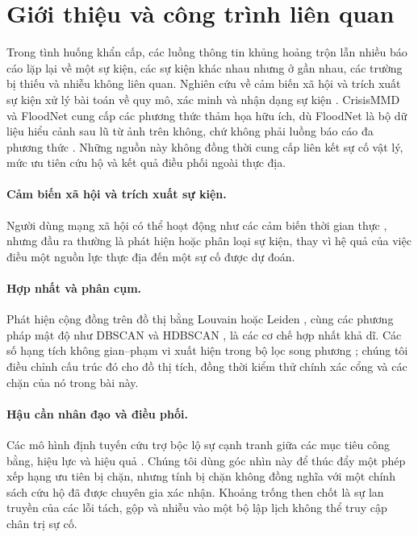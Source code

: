 \documentclass[runningheads]{llncs}
\begin{document}
\section{Giới thiệu và công trình liên quan}

Trong tình huống khẩn cấp, các luồng thông tin khủng hoảng trộn lẫn nhiều
báo cáo lặp lại về một sự kiện, các sự kiện khác nhau nhưng ở gần nhau, các
trường bị thiếu và nhiễu không liên quan. Nghiên cứu về cảm biến xã hội và
trích xuất sự kiện xử lý bài toán về quy mô, xác minh và nhận dạng sự kiện
\cite{sakaki2010earthquake}. CrisisMMD và FloodNet cung cấp các phương thức
thảm họa hữu ích, dù FloodNet là bộ dữ liệu hiểu cảnh sau lũ từ ảnh trên
không, chứ không phải luồng báo cáo đa phương thức
\cite{alam2018crisismmd,rahnemoonfar2021floodnet}. Những nguồn này không
đồng thời cung cấp liên kết sự cố vật lý, mức ưu tiên cứu hộ và kết quả điều
phối ngoài thực địa.

\paragraph{Cảm biến xã hội và trích xuất sự kiện.}
Người dùng mạng xã hội có thể hoạt động như các cảm biến thời gian thực
\cite{sakaki2010earthquake}, nhưng đầu ra thường là phát hiện hoặc phân
loại sự kiện, thay vì hệ quả của việc điều một nguồn lực thực địa đến một sự
cố được dự đoán.

\paragraph{Hợp nhất và phân cụm.}
Phát hiện cộng đồng trên đồ thị bằng Louvain hoặc Leiden
\cite{blondel2008louvain,traag2019leiden}, cùng các phương pháp mật độ như
DBSCAN và HDBSCAN \cite{ester1996dbscan}, là các cơ chế hợp nhất khả dĩ.
Các số hạng tích không gian--phạm vi xuất hiện trong bộ lọc song phương
\cite{tomasi1998bilateral}; chúng tôi điều chỉnh cấu trúc đó cho đồ thị tích,
đồng thời kiểm thử chính xác cổng và các chặn của nó trong bài này.

\paragraph{Hậu cần nhân đạo và điều phối.}
Các mô hình định tuyến cứu trợ bộc lộ sự cạnh tranh giữa các mục tiêu công
bằng, hiệu lực và hiệu quả \cite{gralla2014review}. Chúng tôi dùng góc nhìn
này để thúc đẩy một phép xếp hạng ưu tiên bị chặn, nhưng tính bị chặn không
đồng nghĩa với một chính sách cứu hộ đã được chuyên gia xác nhận. Khoảng
trống then chốt là sự lan truyền của các lỗi tách, gộp và nhiễu vào một bộ
lập lịch không thể truy cập chân trị sự cố.
\end{document}
